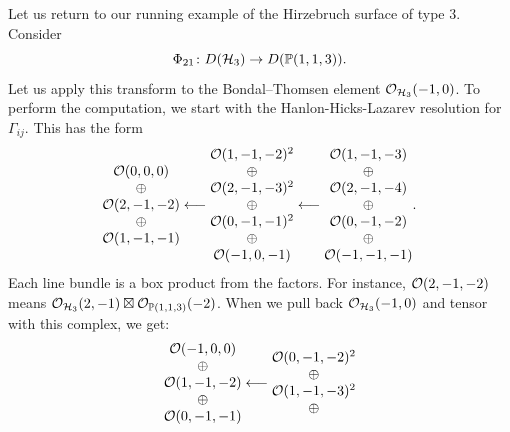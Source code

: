\documentclass{amsart}
\begin{document}
\begin{example}\label{ex:HirzFMTransform}
Let us return to our running example of the Hirzebruch surface of type $3$.  Consider
\[
\Phi_{21}\colon D(\mathcal H_3) \to D(\mathbb P(1,1,3)).
\]
Let us apply this transform to the Bondal--Thomsen element ${\mathcal O}_{\mathcal H_3}(-1,0)$.  To perform the computation, we start with the Hanlon-Hicks-Lazarev resolution for $\Gamma_{ij}$.  This has the form
\[
\begin{matrix}
    {\mathcal O}(0,0,0)\\
    \oplus \\
    {\mathcal O}(2,-1,-2)\\
    \oplus\\
    {\mathcal O}(1,-1,-1)
\end{matrix}
\longleftarrow
\begin{matrix}
    {\mathcal O}(1,-1,-2)^2\\
    \oplus \\
    {\mathcal O}(2,-1,-3)^2\\
    \oplus\\
    {\mathcal O}(0,-1,-1)^2 \\
    \oplus \\
    {\mathcal O}(-1,0,-1)
\end{matrix}
\longleftarrow
\begin{matrix}
    {\mathcal O}(1,-1,-3)\\
    \oplus \\
    {\mathcal O}(2,-1,-4)\\
    \oplus\\
    {\mathcal O}(0,-1,-2)\\
    \oplus \\
    {\mathcal O}(-1,-1,-1)
\end{matrix}.
\]
Each line bundle is a box product from the factors.  For instance, ${\mathcal O}(2,-1,-2)$ means ${\mathcal O}_{\mathcal H_3}(2,-1) \boxtimes {\mathcal O}_{\mathbb P(1,1,3)}(-2)$. When we pull back ${\mathcal O}_{\mathcal H_3}(-1,0)$ and tensor with this complex, we get:
\[
\begin{matrix}
    {\mathcal O}(-1,0,0)\\
    \oplus \\
    {\mathcal O}(1,-1,-2)\\
    \oplus\\
    {\mathcal O}(0,-1,-1)
\end{matrix}
\longleftarrow
\begin{matrix}
    {\mathcal O}(0,-1,-2)^2\\
    \oplus \\
    {\mathcal O}(1,-1,-3)^2\\
    \oplus\\

\end{matrix}\]
\end{example}
\end{document}
